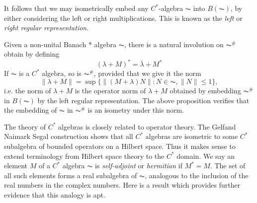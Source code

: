 It follows that we may isometrically embed any $C^*$-algebra $\AC$ into $B(\AC)$, by either considering the left or right multiplications. This is known as the \emph{left} or \emph{right regular representation}.

Given a non-unital Banach $*$ algebra $\AC$, there is a natural involution on $\AC^\#$ obtain by defining
%
\[ (\lambda + M)^* = \overline{\lambda} + M^* \]
%
If $\AC$ is a $C^*$ algebra, so is $\AC^\#$, provided that we give it the norm
%
\[ \| \lambda + M \| = \sup \{ \| (M + \lambda) N \| : N \in \AC, \| N \| \leq 1 \}, \]
%
i.e. the norm of $\lambda + M$ is the operator norm of $\lambda + M$ obtained by embedding $\AC^\#$ in $B(\AC)$ by the left regular representation. 
%
%
%
%
%
%
%
%
%
%
%
%
%
The above proposition verifies that the embedding of $\AC$ in $\AC^\#$ is an isometry under this norm.

The theory of $C^*$ algebras is closely related to operator theory. The Gelfand Naimark Segal construction shows that all $C^*$ algebras are isometric to some $C^*$ subalgebra of bounded operators on a Hilbert space. Thus it makes sense to extend terminology from Hilbert space theory to the $C^*$ domain. We say an element $M$ of a $C^*$ algebra $\AC$ is \emph{self-adjoint} or \emph{hermitian} if $M^* = M$. The set of all such elements forms a real subalgebra of $\AC$, analogous to the inclusion of the real numbers in the complex numbers. Here is a result which provides further evidence that this analogy is apt.

